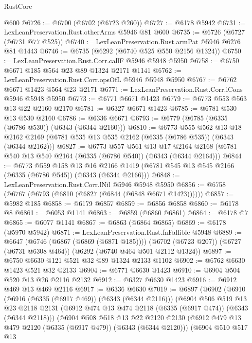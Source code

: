 \begin{lexlean}{RustCore}
\begin{coremodule}
    @600
@6726 := @6700 (@6702 (@6723 @260))
@6727 := @6178 @5942
@6731 := LexLeanPreservation.Rust.otherArms @5946 @81 @600
@6735 := @6726 (@6727 (@6731 @77 @525))
@6740 := LexLeanPreservation.Rust.armPat @5946 @6276 @81 @1443
@6746 := @6735 (@6292 (@6740 @525 @550 @2156 @1324))
@6750 := LexLeanPreservation.Rust.Corr.callF @5946 @5948 @5950
@6758 := @6750 @6671 @185 @564 @23 @89 @1324 @2171 @1141
@6762 := LexLeanPreservation.Rust.Corr.opsOfL @5946 @5948 @5950
@6767 := @6762 @6671 @1423 @564 @23 @2171
@6771 := LexLeanPreservation.Rust.Corr.lCons @5946 @5948 @5950
@6773 := @6771 @6671 @1423
@6779 := @6773 @553 @563 @13 @22 @2160 @2170
@6781 := @6327 @6671 @1423
@6785 := @6781 @530 @13 @530 @2160
@6786 := @6336 @6671
@6793 := @6779 (@6785 (@6335 (@6786 @530)) (@6343 (@6344 @2160)))
@6810 := @6773
    @555
    @562
    @13
    @18
    @2162
    @2169
    (@6781 @535 @13 @535 @2162 (@6335 (@6786 @535)) (@6343 (@6344 @2162)))
@6827 := @6773
    @557
    @561
    @13
    @17
    @2164
    @2168
    (@6781 @540 @13 @540 @2164 (@6335 (@6786 @540)) (@6343 (@6344 @2164)))
@6844 := @6773
    @559
    @158
    @13
    @16
    @2166
    @1419
    (@6781 @545 @13 @545 @2166 (@6335 (@6786 @545)) (@6343 (@6344 @2166)))
@6848 := LexLeanPreservation.Rust.Corr.lNil @5946 @5948 @5950
@6856 := @6758 (@6767 (@6793 (@6810 (@6827 (@6844 (@6848 @6671 @1423))))))
@6857 := @5982 @185
@6858 := @6179 @6857
@6859 := @6856 @6858
@6860 := @6178 @8
@6861 := @6053 @1141
@6863 := @6859 (@6860 @6861)
@6864 := @6178 @7
@6865 := @6077 @1141
@6867 := @6863 (@6864 @6865)
@6869 := @6178 (@5970 @5942)
@6871 := LexLeanPreservation.Rust.fnFallible @5948
@6889 := @6647
    (@6746 (@6867 (@6869 (@6871 @185))))
    (@6702 (@6723 @207))
    (@6727 (@6731 @6308 @464))
    (@6292 (@6740 @464 @501 @2112 @1324))
@6897 := @6750 @6630 @121 @521 @32 @89 @1324 @2133 @1102
@6902 := @6762 @6630 @1423 @521 @32 @2133
@6904 := @6771 @6630 @1423
@6910 := @6904 @504 @520 @13 @26 @2116 @2132
@6912 := @6327 @6630 @1423
@6916 := @6912 @469 @13 @469 @2116
@6917 := @6336 @6630
@7019 := @6897
    (@6902
      (@6910
        (@6916 (@6335 (@6917 @469)) (@6343 (@6344 @2116)))
        (@6904
          @506
          @519
          @13
          @23
          @2118
          @2131
          (@6912 @474 @13 @474 @2118 (@6335 (@6917 @474)) (@6343 (@6344 @2118)))
          (@6904
            @508
            @518
            @13
            @22
            @2120
            @2130
            (@6912 @479 @13 @479 @2120 (@6335 (@6917 @479)) (@6343 (@6344 @2120)))
            (@6904
              @510
              @517
              @13

\end{coremodule}
\end{lexlean}
